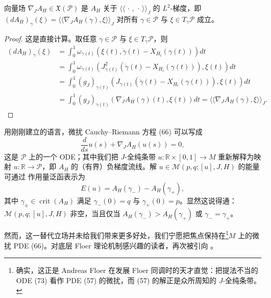 \begin{Lem}\label{lem:5.33}
向量场 $\nabla_JA_H\in\mathfrak X(\mathcal P)$ 是 $A_H$ 关于
$\langle\!\langle\,\cdot\,,\,\cdot\,\rangle\!\rangle_J$ 的 $L^2$-梯度，即
$(dA_H)_\gamma(\xi)=\langle\!\langle\nabla_JA_H(\gamma),\xi\rangle\!\rangle_J$
对所有 $\gamma\in\mathcal P$ 与 $\xi\in T_\gamma\mathcal P$ 成立。
\end{Lem}

\begin{proof}
这是直接计算。取任意 $\gamma\in\mathcal P$ 与 $\xi\in T_\gamma\mathcal P$，则
\begin{align*}
(dA_H)_\gamma(\xi)
&=\int_0^1\omega_{\gamma(t)}\left(\xi(t),\dot\gamma(t)
-X_{H_t}(\gamma(t))\right)dt\\
&=\int_0^1\omega_{\gamma(t)}\left(J^2_{\gamma(t)}
\left(\dot\gamma(t)-X_{H_t}(\gamma(t))\right),\xi(t)\right)dt\\
&=\int_0^1(g_J)_{\gamma(t)}\left(J_{\gamma(t)}
\left(\dot\gamma(t)-X_{H_t}(\gamma(t))\right),\xi(t)\right)dt\\
&=\int_0^1(g_J)_{\gamma(t)}\left(\nabla_JA_H(\gamma)(t),\xi(t)\right)dt
=\langle\!\langle\nabla_JA_H(\gamma),\xi\rangle\!\rangle_J.
\end{align*}
\end{proof}


用刚刚建立的语言，微扰 Cauchy--Riemann 方程 (66) 可以写成
\begin{equation}
\frac{d}{ds}u(s)+\nabla_JA_H(u(s))=0,
\label{eq:5.73}
\end{equation}
这是 $\mathcal P$ 上的一个 ODE；其中我们把 $J$-全纯条带
$u:\mathbb R\times[0,1]\to M$ 重新解释为映射 $u:\mathbb R\to\mathcal P$，即
$A_H$ 的（有界）负梯度流线。解 $u\in\mathcal M(p,q;[u],J,H)$ 的能量可通过
作用量泛函表示为
\[
E(u)=A_H(\gamma_-)-A_H(\gamma_+),
\]
其中 $\gamma_\pm\in\operatorname{crit}(A_H)$ 满足 $\gamma_-(0)=q$ 与
$\gamma_+(0)=p$。显然这说得通：$\mathcal M(p,q;[u],J,H)$ 非空，当且仅当
$A_H(\gamma_-)>A_H(\gamma_+)$ 或 $\gamma_-=\gamma_+$。

然而，这一替代立场并未给我们带来更多好处，我们宁愿把焦点保持在\footnote{确实，这正是 Andreas Floer 在发展 Floer 同调时的天才直觉：把提法不当的 ODE (73) 看作 PDE (57) 的微扰，而 (57) 的解正是众所周知的 $J$-全纯条带。}$M$ 上的微扰
PDE (66)。对底层 Floer 理论机制感兴趣的读者，再次被引向 \cite{Oh91}。

